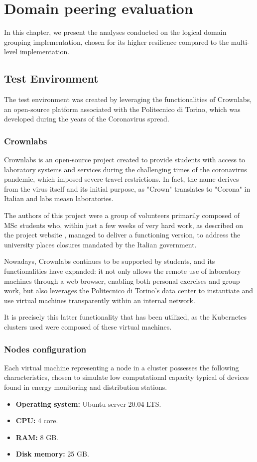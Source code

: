 \chapter{Domain peering evaluation}
In this chapter, we present the analyses conducted on the logical domain grouping implementation, chosen for its higher resilience compared to the multi-level implementation.

\section{Test Environment}
The test environment was created by leveraging the functionalities of Crownlabs, an open-source platform associated with the Politecnico di Torino, which was developed during the years of the Coronavirus spread.

\subsection{Crownlabs}
Crownlabs is an open-source project created to provide students with access to laboratory systems and services during the challenging times of the coronavirus pandemic, which imposed severe travel restrictions. In fact, the name derives from the virus itself and its initial purpose, as "Crown" translates to "Corona" in Italian and labs measn laboratories.

The authors of this project were a group of volunteers primarily composed of MSc students who, within just a few weeks of very hard work, as described on the project website \cite{e1-1}, managed to deliver a functioning version, to address the university places closures mandated by the Italian government.

Nowadays, Crownlabs continues to be supported by students, and its functionalities have expanded: it not only allows the remote use of laboratory machines through a web browser, enabling both personal exercises and group work, but also leverages the Politecnico di Torino's data center to instantiate and use virtual machines transparently within an internal network.

It is precisely this latter functionality that has been utilized, as the Kubernetes clusters used were composed of these virtual machines.

\subsection{Nodes configuration}
Each virtual machine representing a node in a cluster possesses the following characteristics, chosen to simulate low computational capacity typical of devices found in energy monitoring and distribution stations.
\begin{itemize}
\item \textbf{Operating system:}  Ubuntu server 20.04 LTS.
\item \textbf{CPU:} 4 core.
\item \textbf{RAM:} 8 GB.
\item \textbf{Disk memory:} 25 GB.
\end{itemize}

